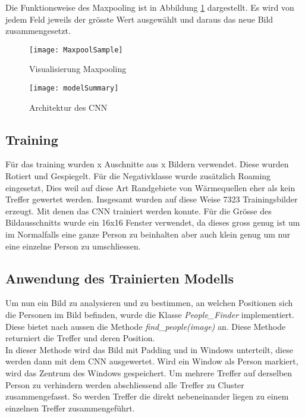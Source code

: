 \noindent Die Funktionsweise des Maxpooling ist in Abbildung \ref{fig:maxpoolSample} dargestellt. Es wird von jedem Feld jeweils der grösste Wert ausgewählt und daraus das neue Bild zusammengesetzt.

\begin{figure}[H]
	\centering
	\texttt{[image: MaxpoolSample]}
	\caption{Visualisierung Maxpooling \parencite{MaxpoolImg2018}}
	\label{fig:maxpoolSample}
\end{figure}

\begin{figure}[H]
	\centering
	\texttt{[image: modelSummary]}
	\caption{Architektur des CNN}
	\label{fig:cnnArchitecture}
\end{figure}

\subsection{Training}

Für das training wurden x Auschnitte aus x Bildern verwendet. Diese wurden Rotiert und Gespiegelt. Für die Negativklasse wurde zusätzlich Roaming eingesetzt, Dies weil auf diese Art Randgebiete von Wärmequellen eher als kein Treffer gewertet werden. Insgesamt wurden auf diese Weise 7323 Trainingsbilder erzeugt. Mit denen das \gls{CNN} trainiert werden konnte. Für die Grösse des Bildausschnitts wurde ein 16x16 Fenster verwendet, da dieses gross genug ist um im Normalfalls eine ganze Person zu beinhalten aber auch klein genug um nur eine einzelne Person zu umschliessen.

\subsection{Anwendung des Trainierten Modells}

Um nun ein Bild zu analysieren und zu bestimmen, an welchen Positionen sich die Personen im Bild befinden, wurde die Klasse \textit{People\_Finder} implementiert. Diese bietet nach aussen die Methode \textit{find\_people(image)} an. Diese Methode returniert die Treffer und deren Position.\\
In dieser Methode wird das Bild mit \gls{Padding} und in \glspl{Window} unterteilt, diese werden dann mit dem \gls{CNN} ausgewertet. Wird ein \gls{Window} als Person markiert, wird das Zentrum des \glspl{Window} gespeichert. Um mehrere Treffer auf derselben Person zu verhindern werden abschliessend alle Treffer zu \gls{Cluster} zusammengefasst. So werden Treffer die direkt nebeneinander liegen zu einem einzelnen Treffer zusammengeführt.


